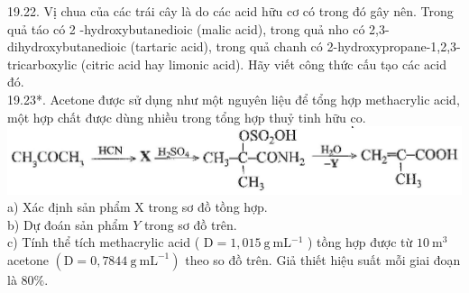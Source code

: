 \documentclass[10pt]{article}
\begin{document}
19.22. Vị chua của các trái cây là do các acid hữu cơ có trong đó gây nên. Trong quả táo có 2 -hydroxybutanedioic (malic acid), trong quả nho có 2,3-dihydroxybutanedioic (tartaric acid), trong quả chanh có 2-hydroxypropane-1,2,3-tricarboxylic (citric acid hay limonic acid). Hãy viết công thức cấu tạo các acid đó.\\
19.23*. Acetone được sử dụng như một nguyên liệu để tổng hợp methacrylic acid, một hợp chất được dùng nhiều trong tổng hợp thuỷ tinh hữu co.\\
\includegraphics[max width=\textwidth, center]{2025_10_23_f2823ef970776205e47bg-62}\\
a) Xác định sản phẩm X trong sơ đồ tồng hợp.\\
b) Dự đoán sản phẩm $Y$ trong sơ đồ trên.\\
c) Tính thể tích methacrylic acid ( $\mathrm{D}=1,015 \mathrm{~g} \mathrm{~mL}{ }^{-1}$ ) tồng hợp được từ $10 \mathrm{~m}^{3}$ acetone $\left(\mathrm{D}=0,7844 \mathrm{~g} \mathrm{~mL}^{-1}\right)$ theo so đồ trên. Giả thiết hiệu suất mỗi giai đoạn là $80 \%$.
\end{document}
